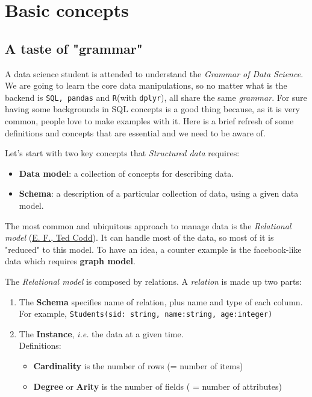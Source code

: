 
\section{Basic concepts}
\subsection{A taste of "grammar"}

A data science student is attended to understand the \emph{Grammar of Data Science}. We are going to learn the core data manipulations, so no matter what is the backend is \texttt{SQL, pandas} and \texttt{R}(with \texttt{dplyr}), all share the same\emph{ grammar}. 
For sure having some backgrounds in SQL concepts is a good thing because, as it is very common, people love to make examples with it. Here is a brief refresh of some definitions and concepts that are essential and we need to be aware of.

Let's start with two key concepts that \emph{Structured data} requires:

\begin{itemize}
  \item {\bf Data model}: a collection of concepts for describing data.
  \item {\bf Schema}: a description of a particular collection of data, using a given data model.
\end{itemize}

The most common and ubiquitous approach to manage data is the \emph{Relational model} (\href{https://en.wikipedia.org/wiki/Edgar\_F.\_Codd}{E. F., Ted Codd}). It can handle most of the data, so most of it is "reduced" to this model. To have an idea, a counter example is the facebook-like data which requires {\bf graph model}. 

The \emph{Relational model} is composed by relations. A \emph{relation} is made up two parts:

 \begin{enumerate}
 \item The {\bf Schema} specifies name of relation, plus name and type of each column. \\ For example, \verb+Students(sid: string, name:string, age:integer)+
  \item The {\bf Instance}, {\it i.e.} the data at a given time. \\
  Definitions:
  \begin{itemize}
   \item {\bf Cardinality} is the number of rows (= number of items)
   \item {\bf Degree} or {\bf Arity} is the number of fields ( = number of attributes)
  \end{itemize}
 \end{enumerate}

